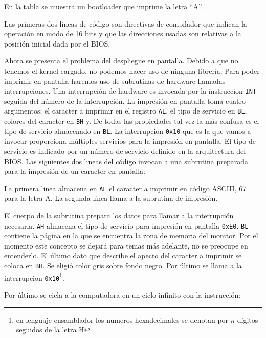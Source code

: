 En la tabla se muestra un bootloader que imprime la letra ``A''.



Las primeras dos líneas de código son directivas de compilador que indican la
operación en modo de 16 bits y que las direcciones usadas son relativas a la
posición inicial dada por el BIOS.

Ahora se presenta el problema del despliegue en pantalla. Debido a que no
tenemos el kernel cargado, no podemos hacer uso de ninguna librería. Para poder
imprimir en pantalla haremos uso de subrutinas de hardware llamadas
interrupciones. Una interrupción de hardware es invocada por la instruccion
\texttt{INT} seguida del número de la interrupción. La impresión en pantalla
toma cuatro argumentos: el caracter a imprimir en el registro \texttt{AL}, el
tipo de servicio en \texttt{BL}, colores del caracter en \texttt{BH} y. De
todas las propiedades tal vez la más confusa es el tipo de servicio almacenado
en \texttt{BL}. La interrupcion \texttt{0x10} que es la que vamos a invocar
proporciona múltiples servicios para la impresión en pantalla. El tipo de
servicio es indicado por un número de servicio definido en la arquitectura del
BIOS. Las siguientes dos lineas del código invocan a una subrutina preparada
para la impresión de un caracter en pantalla:



La primera linea almacena en \texttt{AL} el caracter a imprimir en código
ASCIII, 67 para la letra A. La segunda línea llama a la subrutina de impresión.



El cuerpo de la subrutina prepara los datos para llamar a la interrupción
necesaria. \texttt{AH} almacena el tipo de servicio para impresión en pantalla
\texttt{0xE0}. \texttt{BL} contiene la página en la que se encuentra la zona de
memoria del monitor. Por el momento este concepto se dejará para temas más
adelante, no se preocupe en entenderlo. El último dato que describe el apecto
del caracter a imprimir se coloca en \texttt{BH}. Se eligió color gris sobre
fondo negro. Por último se llama a la interrupcion \texttt{0x10}\footnote{en
lenguaje ensamblador los numeros hexadecimales se denotan por $n$ dígitos
seguidos de la letra H}.

Por último se cicla a la computadora en un ciclo infinito con la instrucción:

